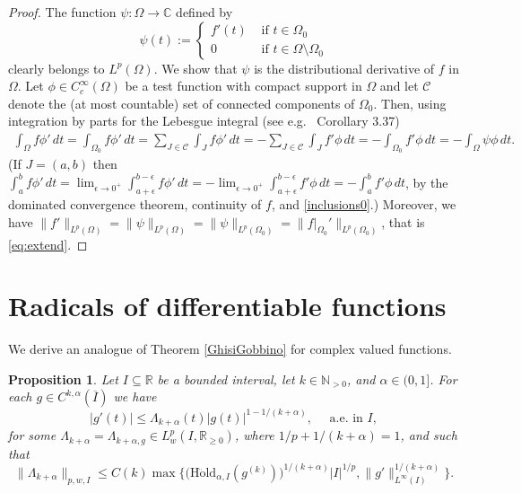 \documentclass[12pt]{amsart}
\theoremstyle{plain}
\newtheorem{proposition}{Proposition}
\theoremstyle{definition}
\numberwithin{equation}{section}
\let\on=\operatorname
\begin{document}
\begin{proof} 
The function ${\psi} : {\Omega} \to {\mathbb{C}}$ defined by  
\[
{\psi}(t) := 
\begin{cases}
  f'(t) & \text{ if } t \in {\Omega}_0\\
  0     & \text{ if } t \in {\Omega} \setminus {\Omega}_0  
\end{cases}
\]
clearly belongs to $L^p({\Omega})$. We show that ${\psi}$ is the distributional derivative of $f$ in ${\Omega}$.
Let ${\phi} \in C^\infty_c({\Omega})$ be a test function with compact support in ${\Omega}$ and 
let ${\mathcal{C}}$ denote the (at most countable) set of connected components of ${\Omega}_0$. 
Then, using integration by parts for the Lebesgue integral (see e.g.\ \cite{Leoni09} Corollary 3.37) 
\begin{align*}
  \int_{\Omega} f {\phi}' \, dt = \int_{{\Omega}_0} f {\phi}'  \, dt = \sum_{J \in {\mathcal{C}}} \int_{J} f {\phi}'  \, dt
  = -\sum_{J \in {\mathcal{C}}} \int_{J} f' {\phi}  \, dt = -\int_{{\Omega}_0} f' {\phi}  \, dt = -\int_{\Omega} {\psi} {\phi}  \, dt.   
\end{align*}  
(If $J=(a,b)$ then $\int_a^b f {\phi}'  \, dt = \lim_{{\epsilon} \to 0^+} \int_{a+{\epsilon}}^{b-{\epsilon}} f {\phi}'  \, dt 
= - \lim_{{\epsilon} \to 0^+} \int_{a+{\epsilon}}^{b-{\epsilon}} f' {\phi}  \, dt
= - \int_a^b f' {\phi}  \, dt$, by the dominated convergence theorem, continuity of $f$, and \eqref{inclusions0}.)
Moreover, we have 
$\|f'\|_{L^p({\Omega})} = \|{\psi}\|_{L^p({\Omega})} = \|{\psi}\|_{L^p({\Omega}_0)} = \|f|_{{\Omega}_0}'\|_{L^p({\Omega}_0)}$, 
that is \eqref{eq:extend}.
\end{proof}

\section{Radicals of differentiable functions} \label{radicals}

We derive an analogue of Theorem \ref{GhisiGobbino} for complex valued functions.

\begin{proposition} \label{prop:radicals}
  Let $I \subseteq {\mathbb{R}}$ be a bounded interval, let $k \in {\mathbb{N}}_{>0}$, and ${\alpha} \in (0,1]$.
  For each $g \in C^{k,{\alpha}}(\overline I)$ we have 
  \begin{equation} \label{est1}
    |g'(t)| \le {\Lambda}_{k+{\alpha}}(t) |g(t)|^{1-1/(k+{\alpha})}, \quad \text{ a.e.\ in } I,
  \end{equation}  
  for some ${\Lambda}_{k+{\alpha}}={\Lambda}_{k+{\alpha},g} \in L_w^p(I,{\mathbb{R}}_{\ge0})$, 
  where $1/p + 1/(k+{\alpha}) = 1$, and such that
  \begin{equation} \label{est2}
    \|{\Lambda}_{k+{\alpha}}\|_{p,w,I} \le C(k) \max\Big\{\big({\on{H\ddot{o}ld}}_{{\alpha},I}(g^{(k)})\big)^{1/(k+{\alpha})}|I|^{1/p}, 
    \|g'\|_{L^\infty(I)}^{1/(k+{\alpha})}\Big\}.
  \end{equation}
\end{proposition}
\end{document}
